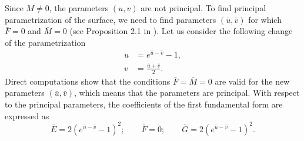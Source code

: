 \documentclass[12pt]{amsart}
\theoremstyle{definition}
\theoremstyle{remark}
\numberwithin{equation}{section}
\begin{document}
Since $M\ne0$, the parameters $(u,v)$ are not principal. To find principal parametrization of the surface,  we need to find parameters $(\bar u, \bar v)$ for which $\bar F=0$ and $\bar M=0$ (see Proposition 2.1 in \cite{G-M-Med}). Let us consider the following change of the parametrization
	\begin{equation*}
	\begin{split}
		u & = e^{ \bar{u}-\bar{v}} -1,
		\\	
		v & = \frac{ \bar{u} + \bar{v}}{2}.
\end{split}
\end{equation*}
Direct computations show  that the conditions $\bar{F}=\bar{M}=0$ are valid for the new  parameters $(\bar u, \bar v)$, which means that the parameters  are principal. 
With respect to the principal parameters, the coefficients of the first fundamental form are expressed as
\begin{equation*}
	\bar E = 2(e^{\bar{u}-\bar{v}} -1)^2; \qquad \bar F =0; \qquad \bar G = 2(e^{\bar{u}-\bar{v}} -1)^2.
\end{equation*}
\end{document}

